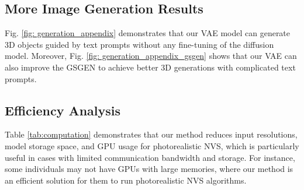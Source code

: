 \subsection{More Image Generation Results}
Fig. \ref{fig: generation_appendix} demonstrates that our VAE model can generate 3D objects guided by text prompts without any fine-tuning of the diffusion model. Moreover, Fig. \ref{fig: generation_appendix_gsgen} shows that our VAE can also improve the GSGEN \citep{chen2024textto3dusinggaussiansplatting} to achieve better 3D generations with complicated text prompts. 


 



\subsection{Efficiency Analysis}

Table \ref{tab:computation} demonstrates that our method reduces input resolutions, model storage space, and GPU usage for photorealistic NVS, which is particularly useful in cases with limited communication bandwidth and storage. For instance, some individuals may not have GPUs with large memories, where our method is an efficient solution for them to run photorealistic NVS algorithms.

\begin{table*}[h]
\caption{Efficiency comparison of different image-space and latent-space NVS methods.}
\vspace{-1em}
\centering
{}
\label{tab:computation}
\end{table*}

